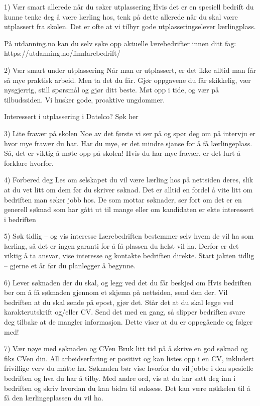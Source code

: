 1) Vær smart allerede når du søker utplassering
Hvis det er en spesiell bedrift du kunne tenke deg å være lærling hos, tenk på dette allerede når du skal være utplassert fra skolen. Det er ofte at vi tilbyr gode utplasseringselever lærlingplass.

På utdanning.no kan du selv søke opp aktuelle lærebedrifter innen ditt fag: https://utdanning.no/finnlarebedrift/

2) Vær smart under utplassering
Når man er utplassert, er det ikke alltid man får så mye praktisk arbeid. Men ta det du får. Gjør oppgavene du får skikkelig, vær nysgjerrig, still spørsmål og gjør ditt beste. Møt opp i tide, og vær på tilbudssiden. Vi husker gode, proaktive ungdommer.

Interessert i utplassering i Datelco? Søk her

3) Lite fravær på skolen
Noe av det første vi ser på og spør deg om på intervju er hvor mye fravær du har. Har du mye, er det mindre sjanse for å få lærlingeplass. Så, det er viktig å møte opp på skolen! Hvis du har mye fravær, er det lurt å forklare hvorfor.

4) Forbered deg
Les om selskapet du vil være lærling hos på nettsiden deres, slik at du vet litt om dem før du skriver søknad. Det er alltid en fordel å vite litt om bedriften man søker jobb hos. De som mottar søknader, ser fort om det er en generell søknad som har gått ut til mange eller om kandidaten er ekte interessert i bedriften

5) Søk tidlig – og vis interesse
Lærebedriften bestemmer selv hvem de vil ha som lærling, så det er ingen garanti for å få plassen du helst vil ha. Derfor er det viktig å ta ansvar, vise interesse og kontakte bedriften direkte. Start jakten tidlig – gjerne et år før du planlegger å begynne.

6) Lever søknaden der du skal, og legg ved det du får beskjed om
Hvis bedriften ber om å få søknaden gjennom et skjema på nettsiden, send den der. Vil bedriften at du skal sende på epost, gjør det. Står det at du skal legge ved karakterutskrift og/eller CV. Send det med en gang, så slipper bedriften svare deg tilbake at de mangler informasjon. Dette viser at du er oppegående og følger med!

7) Vær nøye med søknaden og CVen
Bruk litt tid på å skrive en god søknad og fiks CVen din. All arbeidserfaring er positivt og kan listes opp i en CV, inkludert frivillige verv du måtte ha. Søknaden bør vise hvorfor du vil jobbe i den spesielle bedriften og hva du har å tilby. Med andre ord, vis at du har satt deg inn i bedriften og skriv hvordan du kan bidra til suksess. Det kan være nøkkelen til å få den lærlingeplassen du vil ha.

